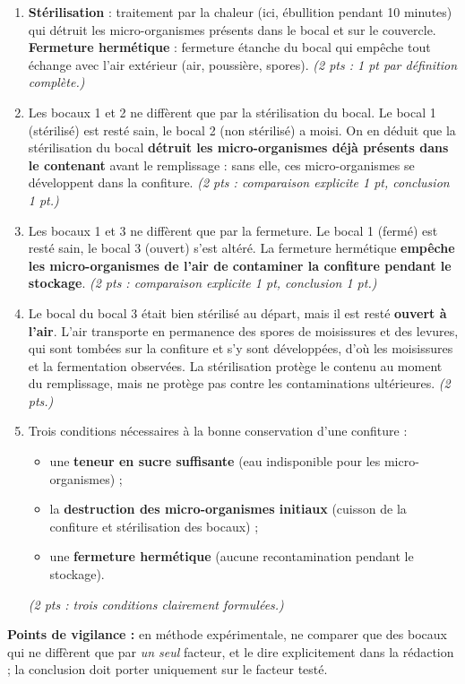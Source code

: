 \documentclass[11pt]{article}
\begin{document}
\begin{corrige}
\begin{enumerate}
\item \textbf{Stérilisation} : traitement par la chaleur (ici, ébullition pendant 10 minutes) qui détruit les micro-organismes présents dans le bocal et sur le couvercle. \textbf{Fermeture hermétique} : fermeture étanche du bocal qui empêche tout échange avec l'air extérieur (air, poussière, spores). \emph{(2 pts : 1 pt par définition complète.)}
\item Les bocaux 1 et 2 ne diffèrent que par la stérilisation du bocal. Le bocal 1 (stérilisé) est resté sain, le bocal 2 (non stérilisé) a moisi. On en déduit que la stérilisation du bocal \textbf{détruit les micro-organismes déjà présents dans le contenant} avant le remplissage : sans elle, ces micro-organismes se développent dans la confiture. \emph{(2 pts : comparaison explicite 1 pt, conclusion 1 pt.)}
\item Les bocaux 1 et 3 ne diffèrent que par la fermeture. Le bocal 1 (fermé) est resté sain, le bocal 3 (ouvert) s'est altéré. La fermeture hermétique \textbf{empêche les micro-organismes de l'air de contaminer la confiture pendant le stockage}. \emph{(2 pts : comparaison explicite 1 pt, conclusion 1 pt.)}
\item Le bocal du bocal 3 était bien stérilisé au départ, mais il est resté \textbf{ouvert à l'air}. L'air transporte en permanence des spores de moisissures et des levures, qui sont tombées sur la confiture et s'y sont développées, d'où les moisissures et la fermentation observées. La stérilisation protège le contenu au moment du remplissage, mais ne protège pas contre les contaminations ultérieures. \emph{(2 pts.)}
\item Trois conditions nécessaires à la bonne conservation d'une confiture :
\begin{itemize}
\item une \textbf{teneur en sucre suffisante} (eau indisponible pour les micro-organismes) ;
\item la \textbf{destruction des micro-organismes initiaux} (cuisson de la confiture et stérilisation des bocaux) ;
\item une \textbf{fermeture hermétique} (aucune recontamination pendant le stockage).
\end{itemize}
\emph{(2 pts : trois conditions clairement formulées.)}
\end{enumerate}
\textbf{Points de vigilance :} en méthode expérimentale, ne comparer que des bocaux qui ne diffèrent que par \emph{un seul} facteur, et le dire explicitement dans la rédaction ; la conclusion doit porter uniquement sur le facteur testé.
\end{corrige}
\end{document}
